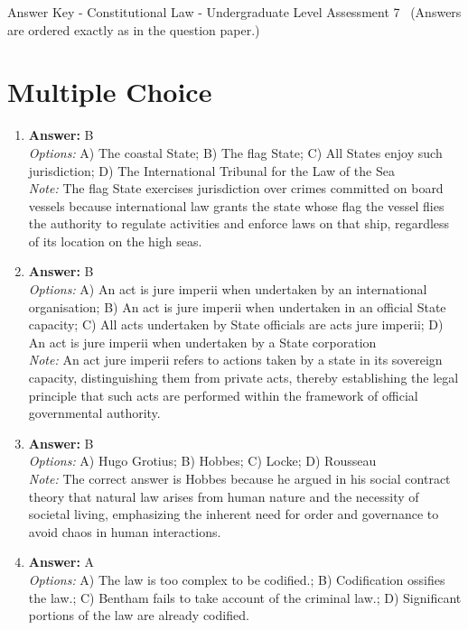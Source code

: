 \documentclass[12pt]{article}
\begin{document}
\begin{center}
Answer Key - Constitutional Law - Undergraduate Level Assessment 7 \
\small (Answers are ordered exactly as in the question paper.)
\end{center}

\section*{Multiple Choice}
\begin{enumerate}[label=\arabic*.]
\item \textbf{Answer:} B
\\ \textit{Options:} A) The coastal State; B) The flag State; C) All States enjoy such jurisdiction; D) The International Tribunal for the Law of the Sea
\\ \textit{Note:} The flag State exercises jurisdiction over crimes committed on board vessels because international law grants the state whose flag the vessel flies the authority to regulate activities and enforce laws on that ship, regardless of its location on the high seas.
\item \textbf{Answer:} B
\\ \textit{Options:} A) An act is jure imperii when undertaken by an international organisation; B) An act is jure imperii when undertaken in an official State capacity; C) All acts undertaken by State officials are acts jure imperii; D) An act is jure imperii when undertaken by a State corporation
\\ \textit{Note:} An act jure imperii refers to actions taken by a state in its sovereign capacity, distinguishing them from private acts, thereby establishing the legal principle that such acts are performed within the framework of official governmental authority.
\item \textbf{Answer:} B
\\ \textit{Options:} A) Hugo Grotius; B) Hobbes; C) Locke; D) Rousseau
\\ \textit{Note:} The correct answer is Hobbes because he argued in his social contract theory that natural law arises from human nature and the necessity of societal living, emphasizing the inherent need for order and governance to avoid chaos in human interactions.
\item \textbf{Answer:} A
\\ \textit{Options:} A) The law is too complex to be codified.; B) Codification ossifies the law.; C) Bentham fails to take account of the criminal law.; D) Significant portions of the law are already codified.

\end{enumerate}
\end{document}
